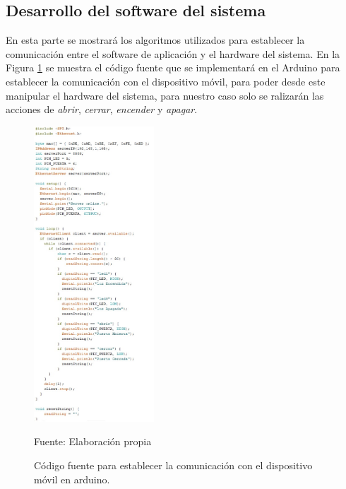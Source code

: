 \newpage
\subsection{Desarrollo del software del sistema}
En esta parte se mostrará los algoritmos utilizados para establecer la comunicación entre el software de aplicación y el hardware del sistema. En la Figura \ref{fig:figura3.62} se muestra el código fuente que se implementará en el Arduino para establecer la comunicación con el dispositivo móvil, para poder desde este manipular el hardware del sistema, para nuestro caso solo se ralizarán las acciones de \textit{abrir}, \textit{cerrar}, \textit{encender} y \textit{apagar}.
\begin{figure}[H]
\captionsetup{justification=centering}
\begin{center}
\includegraphics[width=0.4\textwidth]{Imagenes/Cap3/image062}
\end{center}
\begin{center}
\vskip -0.5cm
\caption{\small{Código fuente para establecer la comunicación con el dispositivo móvil en arduino.}}
\label{fig:figura3.62}
{\small{Fuente: Elaboración propia}}
\end{center}
\end{figure}

